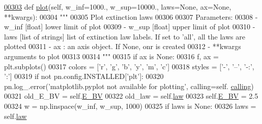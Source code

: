 \begin{DoxyVerb}
\begin{DoxyCode}
\hypertarget{classpyneb_1_1extinction_1_1red__corr_1_1_red_corr_l00303}{}\hyperlink{classpyneb_1_1extinction_1_1red__corr_1_1_red_corr_aa0348dcba9bf9bbdb3296191319c683c}{00303}     \textcolor{keyword}{def }\hyperlink{classpyneb_1_1extinction_1_1red__corr_1_1_red_corr_aa0348dcba9bf9bbdb3296191319c683c}{plot}(self, w\_inf=1000., w\_sup=10000., laws=None, ax=None, **kwargs):
00304         \textcolor{stringliteral}{"""}
00305 \textcolor{stringliteral}{        Plot extinction laws}
00306 \textcolor{stringliteral}{}
00307 \textcolor{stringliteral}{        Parameters:}
00308 \textcolor{stringliteral}{            - w\_inf [float] lower limit of plot}
00309 \textcolor{stringliteral}{            - w\_sup [float] upper limit of plot}
00310 \textcolor{stringliteral}{            - laws [list of strings] list of extinction law labels. If set to 'all', all the laws are
       plotted}
00311 \textcolor{stringliteral}{            - ax : an axis object. If None, onr is created}
00312 \textcolor{stringliteral}{            - **kwargs arguments to plot}
00313 \textcolor{stringliteral}{}
00314 \textcolor{stringliteral}{        """}
00315         \textcolor{keywordflow}{if} ax \textcolor{keywordflow}{is} \textcolor{keywordtype}{None}:
00316             f, ax = plt.subplots()
00317         colors = [\textcolor{stringliteral}{'}\textcolor{stringliteral}{r', '}g', 'b', 'y', 'm', 'c']
00318         styles = [\textcolor{stringliteral}{'-'}, \textcolor{stringliteral}{'--'}, \textcolor{stringliteral}{'-:'}, \textcolor{stringliteral}{':'}]
00319         \textcolor{keywordflow}{if} \textcolor{keywordflow}{not} pn.config.INSTALLED[\textcolor{stringliteral}{'plt'}]:
00320             pn.log\_.error(\textcolor{stringliteral}{'matplotlib.pyplot not available for plotting'}, calling=self.
      \hyperlink{classpyneb_1_1extinction_1_1red__corr_1_1_red_corr_a30606dfd94b4cefefd10dbb1f7cbd473}{calling})
00321         old\_E\_BV = self.\hyperlink{classpyneb_1_1extinction_1_1red__corr_1_1_red_corr_a0bc581bcaa8eeeb67b83ffdec58bf164}{E\_BV}
00322         old\_law = self.\hyperlink{classpyneb_1_1extinction_1_1red__corr_1_1_red_corr_adfed423013315bad4ba5dda2368dc3d0}{law}
00323         self.\hyperlink{classpyneb_1_1extinction_1_1red__corr_1_1_red_corr_a0bc581bcaa8eeeb67b83ffdec58bf164}{E\_BV} = 2.5
00324         w = np.linspace(w\_inf, w\_sup, 1000)
00325         \textcolor{keywordflow}{if} laws \textcolor{keywordflow}{is} \textcolor{keywordtype}{None}:
00326             laws = self.\hyperlink{classpyneb_1_1extinction_1_1red__corr_1_1_red_corr_adfed423013315bad4ba5dda2368dc3d0}{law}

\end{DoxyCode}
\end{DoxyVerb}
